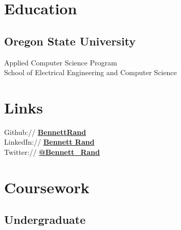 \documentclass[letterpaper]{deedy-resume} %
\begin{document}
\begin{minipage}[t]{0.33\textwidth} %


\section{Education} 

\subsection{Oregon State University}

Applied Computer Science Program \\
School of Electrical Engineering and Computer Science \\


\sectionspace %


\section{Links} 

Github:// \href{https://github.com/BennettRand}{\bf BennettRand} \\
LinkedIn:// \href{https://www.linkedin.com/pub/bennett-rand/51/76a/679}{\bf Bennett Rand} \\
Twitter:// \href{https://twitter.com/Bennett_Rand/}{\bf @Bennett\_Rand} \\

\sectionspace %


\section{Coursework}

\subsection{Undergraduate}
\vspace{\topsep} %


\end{minipage}
\end{document}
